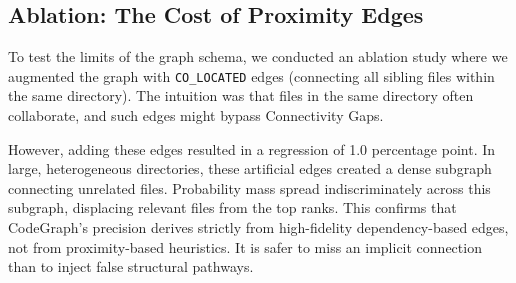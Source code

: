 \subsection{Ablation: The Cost of Proximity Edges}

To test the limits of the graph schema, we conducted an ablation study where we augmented the graph with \texttt{CO\_LOCATED} edges (connecting all sibling files within the same directory). The intuition was that files in the same directory often collaborate, and such edges might bypass Connectivity Gaps.

However, adding these edges resulted in a regression of 1.0 percentage point. In large, heterogeneous directories, these artificial edges created a dense subgraph connecting unrelated files. Probability mass spread indiscriminately across this subgraph, displacing relevant files from the top ranks. This confirms that CodeGraph's precision derives strictly from high-fidelity dependency-based edges, not from proximity-based heuristics. It is safer to miss an implicit connection than to inject false structural pathways.
